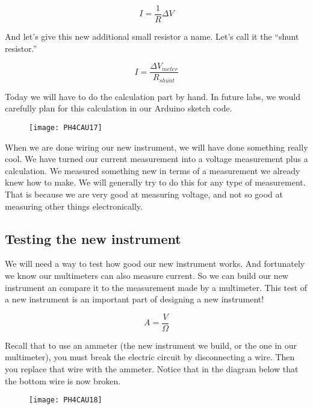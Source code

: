 \begin{equation*}
I=\frac{1}{R}\Delta V
\end{equation*}

And let's give this new additional small resistor a name. Let's call it the ``shunt resistor.''

\begin{equation*}
	I=\frac{\Delta V_{meter}}{R_{shunt}}
\end{equation*}

Today we will have to do the calculation part by hand. In future labs, we would carefully plan for this calculation in our Arduino sketch code.

\begin{figure}[h!]
	\centering
    \texttt{[image: PH4CAU17]}
\end{figure}

When we are done wiring our new instrument, we will have done something really cool. We have turned our current measurement into a voltage measurement plus a calculation. We measured something new in terms of a measurement we already knew how to make. We will generally try to do this for any type of
measurement. That is because we are very good at measuring voltage, and not so good at measuring other things electronically.

\subsection{Testing the new instrument}

We will need a way to test how good our new instrument works. And fortunately we know our multimeters can also measure current. So we can build our new instrument an compare it to the measurement made by a multimeter. This test of a new instrument is an important part of designing a new instrument!

\begin{equation*}
	\unit{A}=\frac{\unit{V}}{\unit{\Omega}}
\end{equation*}

Recall that to use an ammeter (the new instrument we build, or the one in our multimeter), you must break the electric circuit by disconnecting a wire. Then you replace that wire with the ammeter. Notice that in the diagram below that the bottom wire is now broken. 

\begin{figure}[h!]
	\centering
     \texttt{[image: PH4CAU18]}
\end{figure}


